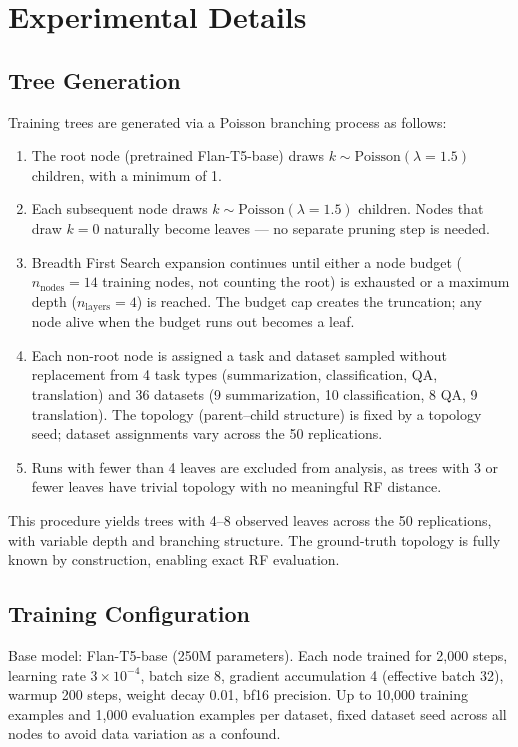 \documentclass{article}
\theoremstyle{definition}
\theoremstyle{plain}
\begin{document}
\section{Experimental Details}
\label{app:details}

\subsection*{Tree Generation}
\label{app:tree-gen}

Training trees are generated via a Poisson branching process as follows:

\begin{enumerate}
    \item The root node (pretrained Flan-T5-base) draws $k \sim \mathrm{Poisson}(\lambda = 1.5)$ children, with a minimum of 1.
    \item Each subsequent node draws $k \sim \mathrm{Poisson}(\lambda = 1.5)$ children. Nodes that draw $k = 0$ naturally become leaves --- no separate pruning step is needed.
    \item Breadth First Search expansion continues until either a node budget ($n_\mathrm{nodes} = 14$ training nodes, not counting the root) is exhausted or a maximum depth ($n_\mathrm{layers} = 4$) is reached. The budget cap creates the truncation; any node alive when the budget runs out becomes a leaf.
    \item Each non-root node is assigned a task and dataset sampled without replacement from 4 task types (summarization, classification, QA, translation) and 36 datasets (9 summarization, 10 classification, 8 QA, 9 translation). The topology (parent--child structure) is fixed by a topology seed; dataset assignments vary across the 50 replications.
    \item Runs with fewer than 4 leaves are excluded from analysis, as trees with 3 or fewer leaves have trivial topology with no meaningful RF distance.
\end{enumerate}

This procedure yields trees with 4--8 observed leaves across the 50 replications, with variable depth and branching structure. The ground-truth topology is fully known by construction, enabling exact RF evaluation.

\subsection*{Training Configuration}
Base model: Flan-T5-base (250M parameters). Each node trained for 2,000 steps, learning rate $3 \times 10^{-4}$, batch size 8, gradient accumulation 4 (effective batch 32), warmup 200 steps, weight decay 0.01, bf16 precision. Up to 10,000 training examples and 1,000 evaluation examples per dataset, fixed dataset seed across all nodes to avoid data variation as a confound.
\end{document}
